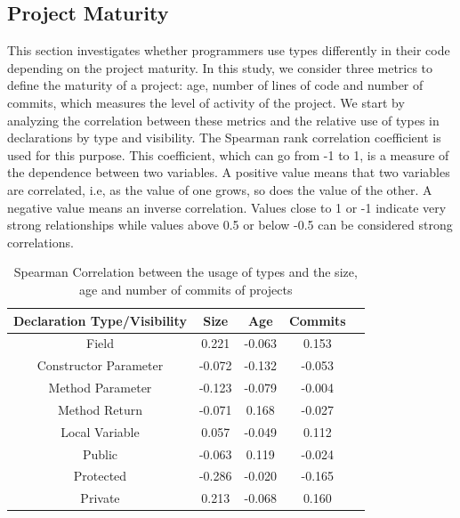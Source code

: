 \documentclass[preprint]{sigplanconf}
\begin{document}
\subsection{Project Maturity\label{res-size}}


This section investigates whether programmers use types differently in their code depending on the project maturity.
In this study, we consider three metrics to define the maturity of a project: age, number of lines of code and number of commits, which measures the level of activity of the project.
We start by analyzing the correlation between these metrics and the relative use of types in declarations by type and visibility.
The Spearman rank correlation coefficient is used for this purpose.
This coefficient, which can go from -1 to 1, is a measure of the dependence between two variables.
A positive value means that two variables are correlated, i.e, as the value of one grows, so does the value of the other.
A negative value means an inverse correlation.
Values close to 1 or -1 indicate very strong relationships while values above 0.5 or below -0.5 can be considered strong correlations.

\begin{table}[h!]
\centering{}%
\begin{tabular}{|c|c|c|c|c|}
\hline 
Declaration Type/Visibility	& Size		& Age	&	Commits\\
\hline 
\hline 
Field						&  0.221	& -0.063	&  0.153	\\ \hline
Constructor Parameter		& -0.072	& -0.132	& -0.053	\\ \hline
Method Parameter			& -0.123	& -0.079	& -0.004	\\ \hline
Method Return				& -0.071	&  0.168	& -0.027	\\ \hline
Local Variable		 		&  0.057	& -0.049	&  0.112	\\ 
\hline 			 
\hline 		 
Public						& -0.063	&   0.119	& -0.024	\\ \hline
Protected					& -0.286	&  -0.020	& -0.165	\\ \hline
Private				 		&  0.213	&  -0.068	&  0.160	\\ \hline
\end{tabular}
\label{tab:all_correlation_maturity}
\caption{Spearman Correlation between the usage of types and the size, age and number of commits of projects}
\end{table}	
\end{document}

